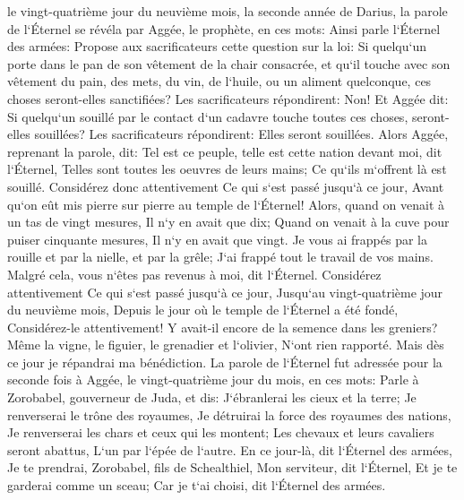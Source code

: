 \verse le vingt-quatrième jour du neuvième mois, la seconde année de Darius, la parole de l`Éternel se révéla par Aggée, le prophète, en ces mots: 
\verse Ainsi parle l`Éternel des armées: Propose aux sacrificateurs cette question sur la loi: 
\verse Si quelqu`un porte dans le pan de son vêtement de la chair consacrée, et qu`il touche avec son vêtement du pain, des mets, du vin, de l`huile, ou un aliment quelconque, ces choses seront-elles sanctifiées? Les sacrificateurs répondirent: Non! 
\verse Et Aggée dit: Si quelqu`un souillé par le contact d`un cadavre touche toutes ces choses, seront-elles souillées? Les sacrificateurs répondirent: Elles seront souillées. 
\verse Alors Aggée, reprenant la parole, dit: Tel est ce peuple, telle est cette nation devant moi, dit l`Éternel, Telles sont toutes les oeuvres de leurs mains; Ce qu`ils m`offrent là est souillé. 
\verse Considérez donc attentivement Ce qui s`est passé jusqu`à ce jour, Avant qu`on eût mis pierre sur pierre au temple de l`Éternel! 
\verse Alors, quand on venait à un tas de vingt mesures, Il n`y en avait que dix; Quand on venait à la cuve pour puiser cinquante mesures, Il n`y en avait que vingt. 
\verse Je vous ai frappés par la rouille et par la nielle, et par la grêle; J`ai frappé tout le travail de vos mains. Malgré cela, vous n`êtes pas revenus à moi, dit l`Éternel. 
\verse Considérez attentivement Ce qui s`est passé jusqu`à ce jour, Jusqu`au vingt-quatrième jour du neuvième mois, Depuis le jour où le temple de l`Éternel a été fondé, Considérez-le attentivement! 
\verse Y avait-il encore de la semence dans les greniers? Même la vigne, le figuier, le grenadier et l`olivier, N`ont rien rapporté. Mais dès ce jour je répandrai ma bénédiction. 
\verse La parole de l`Éternel fut adressée pour la seconde fois à Aggée, le vingt-quatrième jour du mois, en ces mots: 
\verse Parle à Zorobabel, gouverneur de Juda, et dis: J`ébranlerai les cieux et la terre; 
\verse Je renverserai le trône des royaumes, Je détruirai la force des royaumes des nations, Je renverserai les chars et ceux qui les montent; Les chevaux et leurs cavaliers seront abattus, L`un par l`épée de l`autre. 
\verse En ce jour-là, dit l`Éternel des armées, Je te prendrai, Zorobabel, fils de Schealthiel, Mon serviteur, dit l`Éternel, Et je te garderai comme un sceau; Car je t`ai choisi, dit l`Éternel des armées. 
